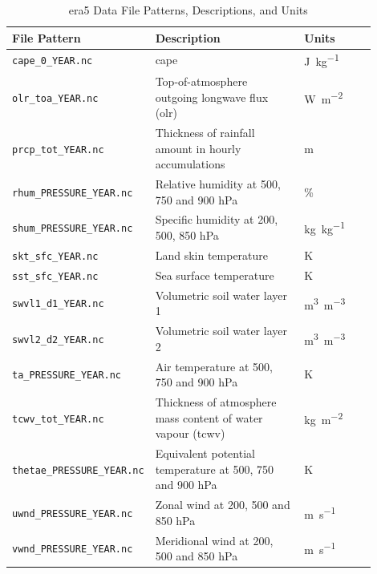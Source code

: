 \begin{table}[ht]
    \centering
    \caption{\acrshort{era5} Data File Patterns, Descriptions, and Units}
    \label{tab:era5-file-patterns}
    \begin{tabular}{p{0.28\linewidth} p{0.42\linewidth} p{0.2\linewidth}}
        \toprule
        File Pattern & Description & Units \\
        \midrule
        \texttt{cape\_0\_YEAR.nc} & \acrfull{cape} & \unit{\joule\per\kilogram} \\
        \texttt{olr\_toa\_YEAR.nc} & Top-of-atmosphere outgoing longwave flux (\acrfull{olr}) & \unit{\watt\per\meter\squared} \\
        \texttt{prcp\_tot\_YEAR.nc} & Thickness of rainfall amount in hourly accumulations & \unit{\meter} \\
        \texttt{rhum\_PRESSURE\_YEAR.nc} & Relative humidity at 500, 750 and 900 \unit{\hecto\pascal} & \unit{\percent} \\
        \texttt{shum\_PRESSURE\_YEAR.nc} & Specific humidity at 200, 500, 850 \unit{\hecto\pascal} & \unit{\kilogram\per\kilogram} \\
        \texttt{skt\_sfc\_YEAR.nc} & Land skin temperature & \unit{\kelvin} \\
        \texttt{sst\_sfc\_YEAR.nc} & Sea surface temperature & \unit{\kelvin} \\
        \texttt{swvl1\_d1\_YEAR.nc} & Volumetric soil water layer 1 & \unit{\meter\cubed\per\meter\cubed} \\
        \texttt{swvl2\_d2\_YEAR.nc} & Volumetric soil water layer 2 & \unit{\meter\cubed\per\meter\cubed} \\
        \texttt{ta\_PRESSURE\_YEAR.nc} & Air temperature at 500, 750 and 900 \unit{\hecto\pascal} & \unit{\kelvin} \\
        \texttt{tcwv\_tot\_YEAR.nc} & Thickness of atmosphere mass content of water vapour (\acrfull{tcwv}) & \unit{\kilogram\per\meter\squared} \\
        \texttt{thetae\_PRESSURE\_YEAR.nc} & Equivalent potential temperature at 500, 750 and 900 \unit{\hecto\pascal} & \unit{\kelvin} \\
        \texttt{uwnd\_PRESSURE\_YEAR.nc} & Zonal wind at 200, 500 and 850 \unit{\hecto\pascal} & \unit{\meter\per\second} \\
        \texttt{vwnd\_PRESSURE\_YEAR.nc} & Meridional wind at 200, 500 and 850 \unit{\hecto\pascal} & \unit{\meter\per\second} \\
        \bottomrule
    \end{tabular}
\end{table}


